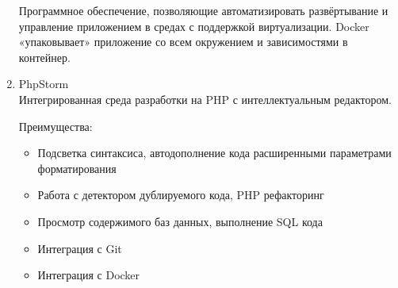 \documentclass[tools.tex]{subfiles}
\begin{document}
\begin{enumerate}
    Программное обеспечение, позволяющие автоматизировать развёртывание и
    управление приложением в средах с поддержкой виртуализации. Docker «упаковывает»
    приложение со всем окружением и зависимостями в контейнер.
    \item PhpStorm\\
    Интегрированная среда разработки на PHP с интеллектуальным редактором.
    \par
    Преимущества:
    \begin{itemize}
      \item Подсветка синтаксиса, автодополнение кода расширенными параметрами форматирования
      \item Работа с детектором дублируемого кода, PHP рефакторинг
      \item Просмотр содержимого баз данных, выполнение SQL кода
      \item Интеграция с Git
      \item Интеграция с Docker
    \end{itemize}
  \end{enumerate}
\end{document}
